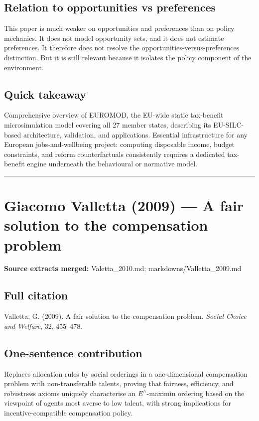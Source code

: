 \documentclass[11pt,a4paper]{article}
\begin{document}
\subsection*{Relation to opportunities vs preferences}
This paper is much weaker on opportunities and preferences than on policy mechanics. It does not model opportunity sets, and it does not estimate preferences. It therefore does not resolve the opportunities-versus-preferences distinction. But it is still relevant because it isolates the policy component of the environment.

\subsection*{Quick takeaway}
Comprehensive overview of EUROMOD, the EU-wide static tax-benefit microsimulation model covering all 27 member states, describing its EU-SILC-based architecture, validation, and applications. Essential infrastructure for any European jobs-and-wellbeing project: computing disposable income, budget constraints, and reform counterfactuals consistently requires a dedicated tax-benefit engine underneath the behavioural or normative model.


\medskip\hrule\medskip

\section*{Giacomo Valletta (2009) — A fair solution to the compensation problem}

\textbf{Source extracts merged:} Valetta\_2010.md; markdowns/Valletta\_2009.md

\subsection*{Full citation}
Valletta, G. (2009). A fair solution to the compensation problem. \textit{Social Choice and Welfare}, 32, 455--478.

\subsection*{One-sentence contribution}
Replaces allocation rules by social orderings in a one-dimensional compensation problem with non-transferable talents, proving that fairness, efficiency, and robustness axioms uniquely characterise an $E^{\wedge}$-maximin ordering based on the viewpoint of agents most averse to low talent, with strong implications for incentive-compatible compensation policy.
\end{document}
